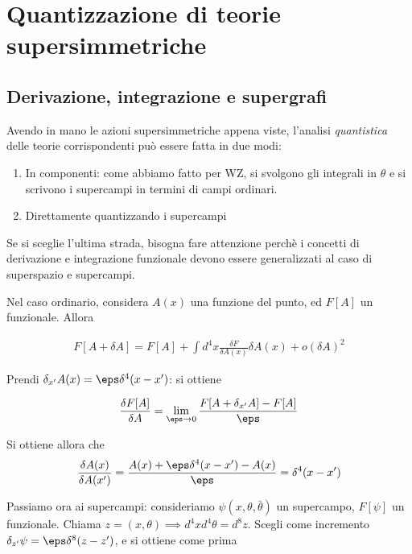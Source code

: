 \documentclass{report}
\begin{document}
\chapter{Quantizzazione di teorie supersimmetriche}

\section{Derivazione, integrazione e supergrafi}


Avendo in mano le azioni supersimmetriche appena viste, l'analisi \emph{quantistica} delle teorie corrispondenti può essere fatta in due modi: 

\begin{enumerate}
    \item In componenti: come abbiamo fatto per WZ, si svolgono gli integrali in \(\theta\) e si scrivono i supercampi in termini di campi ordinari. 
    \item Direttamente quantizzando i supercampi 
\end{enumerate}

Se si sceglie l'ultima strada, bisogna fare attenzione perchè i concetti di derivazione e integrazione funzionale devono essere generalizzati al caso di superspazio e supercampi. 

Nel caso ordinario, considera \(A(x)\) una funzione del punto, ed \(F[A]\) un funzionale. Allora 

\begin{align}
    F[A+\delta A] = F[A] + \int d^4x \frac{\delta F}{\delta A(x)}\delta A(x) + o(\delta A)^2
\end{align}

Prendi \(\delta_{x'} A(x) = \eps \delta^4(x-x')\): si ottiene 

\begin{align}
    \frac{\delta F[A]}{\delta A} = \lim_{\eps \to 0}\frac{F[A+\delta_{x'}A] - F[A]}{\eps}
\end{align}

Si ottiene allora che 
\begin{align}
    \frac{\delta A(x)}{\delta A(x')} = \frac{A(x) + \eps \delta^4(x-x') - A(x)}{\eps} = \delta^4(x-x')
\end{align}

Passiamo ora ai supercampi: consideriamo \(\psi(x, \theta, \bar{\theta})\) un supercampo, \(F[\psi]\) un funzionale. Chiama \(z = (x, \theta) \implies d^4x d^4\theta = d^8z\). Scegli come incremento \(\delta_{z'}\psi = \eps\delta^8(z-z')\), e si ottiene come prima 
\end{document}
